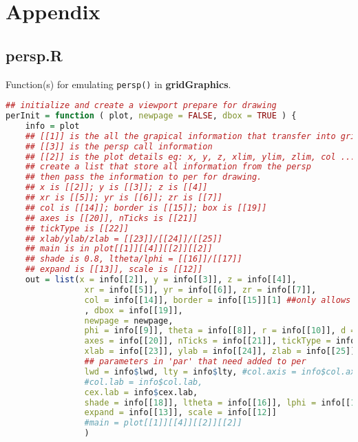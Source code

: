 







\setlength{\parindent}{1pt}
\noindent


\newpage
\chapter{Appendix}
\section{persp.R}
Function(s) for emulating \texttt{persp()} in \textbf{gridGraphics}.
\begin{lstlisting}[language = R]
## initialize and create a viewport prepare for drawing
perInit = function ( plot, newpage = FALSE, dbox = TRUE ) {
    info = plot
    ## [[1]] is the all the grapical information that transfer into grid
    ## [[3]] is the persp call information
    ## [[2]] is the plot details eg: x, y, z, xlim, ylim, zlim, col ...
    ## create a list that store all information from the persp
    ## then pass the information to per for drawing.
    ## x is [[2]]; y is [[3]]; z is [[4]]
    ## xr is [[5]]; yr is [[6]]; zr is [[7]]
    ## col is [[14]]; border is [[15]]; box is [[19]]
    ## axes is [[20]], nTicks is [[21]]
    ## tickType is [[22]]
    ## xlab/ylab/zlab = [[23]]/[[24]]/[[25]]
    ## main is in plot[[1]][[4]][[2]][[2]]
    ## shade is 0.8, ltheta/lphi = [[16]]/[[17]]
    ## expand is [[13]], scale is [[12]]
    out = list(x = info[[2]], y = info[[3]], z = info[[4]],
                xr = info[[5]], yr = info[[6]], zr = info[[7]],
                col = info[[14]], border = info[[15]][1] ##only allows one color for border
                , dbox = info[[19]],
                newpage = newpage, 
                phi = info[[9]], theta = info[[8]], r = info[[10]], d = info[[11]],
                axes = info[[20]], nTicks = info[[21]], tickType = info[[22]],
                xlab = info[[23]], ylab = info[[24]], zlab = info[[25]],
                ## parameters in 'par' that need added to per
                lwd = info$lwd, lty = info$lty, #col.axis = info$col.axis,
                #col.lab = info$col.lab, 
                cex.lab = info$cex.lab, 
                shade = info[[18]], ltheta = info[[16]], lphi = info[[17]],
                expand = info[[13]], scale = info[[12]]
                #main = plot[[1]][[4]][[2]][[2]]
                )


\end{lstlisting}
